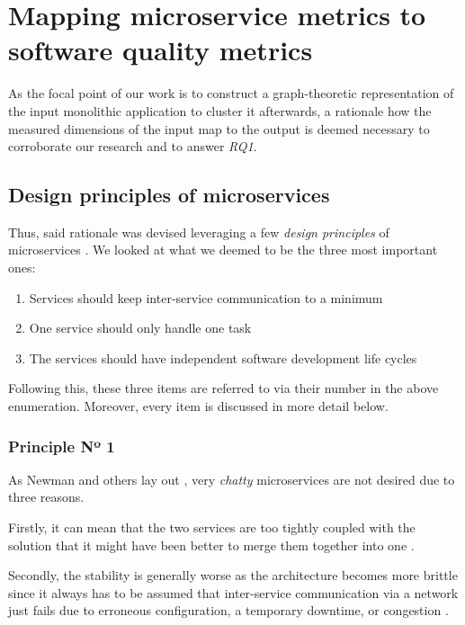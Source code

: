 \documentclass[12pt,a4paper]{report}
\begin{document}
\chapter{Mapping microservice metrics to software quality metrics} \label{chap:rationale}

As the focal point of our work is to construct a graph-theoretic representation
of the input monolithic application to cluster it afterwards,
a rationale how the measured dimensions of the input map to the output
is deemed necessary to corroborate our research and to answer \textit{RQ1}.



\section{Design principles of microservices}

Thus, said rationale was devised leveraging a few \textit{design principles}
of microservices \cite{ms-design-principles, ms-fowler, newman2015building}.
We looked at what we deemed to be the three most important ones:
\begin{enumerate}
  \item Services should keep inter-service communication to a minimum
  \item One service should only handle one task
  \item The services should have independent software development life cycles
\end{enumerate}
Following this, these three items are referred to via their number in the
above enumeration. Moreover, every item is discussed in more detail below.


\subsection{Principle Nº 1}
As Newman and others lay out \cite{newman2015building, alshuqayran2016systematic},
very \textit{chatty} microservices are not desired due to three reasons.

Firstly, it can mean that the two services are too tightly coupled with
the solution that it might have been better to merge them together into one
\cite{newman2015building}.

Secondly, the stability is generally worse as the architecture becomes
more brittle since it always has to be assumed that inter-service communication
via a network just fails due to erroneous configuration, a temporary downtime,
or congestion \cite{newman2015building, alshuqayran2016systematic}.
\end{document}
